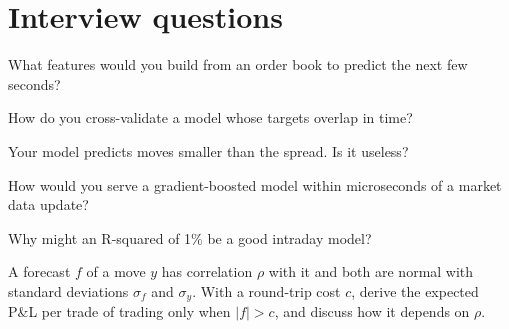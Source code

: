 \section{Interview questions}

\begin{interviewq}\label{iq:s1:intraday-machine-learned-alphas:1}
What features would you build from an order book to predict the next few seconds?
\end{interviewq}

\begin{interviewq}\label{iq:s1:intraday-machine-learned-alphas:2}
How do you cross-validate a model whose targets overlap in time?
\end{interviewq}

\begin{interviewq}\label{iq:s1:intraday-machine-learned-alphas:3}
Your model predicts moves smaller than the spread. Is it useless?
\end{interviewq}

\begin{interviewq}\label{iq:s1:intraday-machine-learned-alphas:4}
How would you serve a gradient-boosted model within microseconds of a market data update?
\end{interviewq}

\begin{interviewq}\label{iq:s1:intraday-machine-learned-alphas:5}
Why might an R-squared of 1\% be a good intraday model?
\end{interviewq}

\begin{interviewq}\label{iq:s1:intraday-machine-learned-alphas:6}
A forecast $f$ of a move $y$ has correlation $\rho$ with it and both are normal with standard deviations $\sigma_f$ and $\sigma_y$. With a round-trip cost
$c$, derive the expected P\&L per trade of trading only when $|f| > c$, and discuss how it depends on $\rho$.
\end{interviewq}
